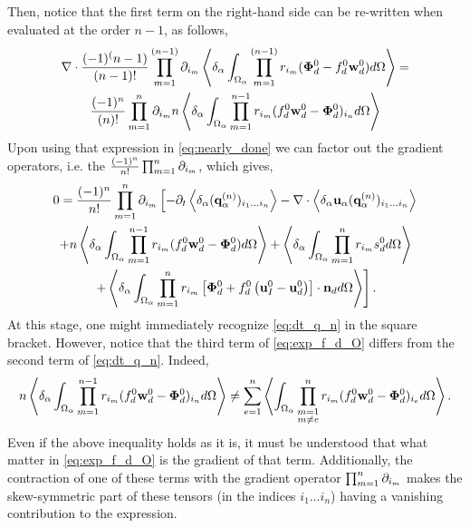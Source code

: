 Then, notice that the first term on the right-hand side can be re-written when evaluated at the order $n-1$, as follows,
\begin{multline*}
    \div \expo[(n-1)]{(\bm\Phi_d^0 - f_d^0 \textbf{w}_d^0)}
    = \\
    \frac{(-1)^{n}}{{(n)}!} \partialp{1}{n}  n \pOavg{ \pri{1}{n-1}(f_d^0 \textbf{w}_d^0 - \bm\Phi_d^0)_{i_{n}} }
\end{multline*} 
Upon using that expression in \ref{eq:nearly_done} we can factor out the gradient operators, i.e. the $\frac{(-1)^n}{n!} \partialp{1}{n}$, which gives, 
\begin{multline}
    0 = \frac{(-1)^n}{n!}
    \partialp{1}{n}
    \left[
        - \partial_t
        \pavg{(\textbf{q}_\alpha^{(n)})_{i_1\ldots i_n}}
        - \div \pavg{\textbf{u}_\alpha (\textbf{q}_\alpha^{(n)})_{i_1\ldots i_n}}
    \right.\\\left.
        +n\pavg{\int_{\Omega_\alpha} \pri{1}{n-1} (f_d^0 \textbf{w}_d^0-\bm\Phi_d^0) d\Omega}
        +\pavg{\int_{\Omega_\alpha} \pri{1}{n} s_d^0 d\Omega}
        \right.\\\left.
        +\pavg{\int_{\Omega_\alpha} \pri{1}{n} \left[
            \bm\Phi_d^0
            + f_d^0
            \left(
                \textbf{u}_I^0
                - \textbf{u}_d^0
            \right)
        \right]
        \cdot \textbf{n}_d d\Omega}
    \right].
    \label{eq:exp_f_d_O}
\end{multline}
At this stage, one might immediately recognize \ref{eq:dt_q_n} in the square bracket. 
However, notice that the third term of \ref{eq:exp_f_d_O} differs from the second term of \ref{eq:dt_q_n}. 
Indeed, 
\begin{equation}
    n\pavg{\int_{\Omega_\alpha} \pri{1}{n-1} ( f_d^0 \textbf{w}_d^0-\bm\Phi_d^0)_{i_n} d\Omega}
    \neq
    \sum_{e=1}^{n} 
    \avg{
        \intO{
        \prod^{n}_{\substack{ m=1 \\m \neq e}} r_{i_m} (f_d^0 \textbf{w}_d^0  - \bm\Phi_d^0)_{i_e}
        }
    }. 
    \label{eq:ineq_which_does_not_make_sens}
\end{equation}
Even if the above inequality holds as it is, it must be understood that what matter in \ref{eq:exp_f_d_O} is the gradient of that term. 
Additionally, the contraction of one of these terms with the gradient operator $\partialp{1}{n}$ makes the skew-symmetric part of these tensors (in the indices $i_1\ldots i_n$) having a vanishing contribution to the expression.
